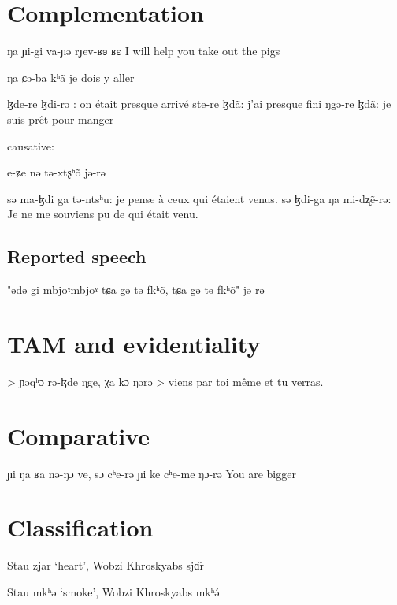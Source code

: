 \documentclass[oneside,a4paper,11pt]{article}
\newcommand{\ipa}[1]{{\phon #1}} %
\begin{document}
\section{Complementation}  

  ŋa ɲi-gi va-ɲə rɟev-ʁʚ ʁʚ
  I will help you take out the pigs


 ŋa ɕə-ba kʰã
 je dois y aller
 
 		ɮde-re ɮdi-rə : on était presque arrivé 
		ste-re ɮdã: j'ai presque fini
		ŋgə-re ɮdã: je suis prêt pour manger
		
causative:

e-ʑe nə tə-xtʂʰõ jə-rə


		sə ma-ɮdi ga tə-ntsʰu: je pense à ceux qui étaient venus.
		sə ɮdi-ga ŋa mi-dʐẽ-rə: Je ne me souviens pu de qui était venu.
\subsection{Reported speech} 
		"ədə-gi mbjoˠmbjoˠ tɕa gə tə-fkʰõ, tɕa gə tə-fkʰõ" jə-rə

 \section{TAM and evidentiality} \label{sec:TAM}

 
	>	ɲəqʰɔ rə-ɮde ŋge, χa kɔ ŋərə
	>	viens par toi même et tu verras.
\section{Comparative}
	ɲi ŋa ʁa nə-ŋɔ ve, sɔ cʰe-rə
	ɲi ke cʰe-me ŋɔ-rə
	You are  bigger 
\section{Classification} \label{sec:classification}
 
 
  \citet{lai14person}


Stau \ipa{zjar} `heart', Wobzi Khroskyabs \ipa{sjɑ̂r}

Stau \ipa{mkʰə} `smoke', Wobzi Khroskyabs \ipa{mkʰə́}




\end{document}
